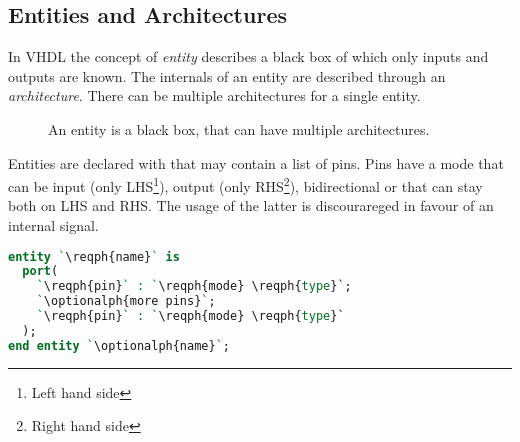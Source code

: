 \subsection{Entities and Architectures} \label{sec:vhdl:entities-arch}
In VHDL the concept of \emph{entity} describes a black box of which only
inputs and outputs are known. The internals of an entity are described through
an \emph{architecture}. There can be multiple architectures for a single entity.

\begin{figure}[h]
  \centering
  \caption{An entity is a black box, that can have multiple architectures.}
\end{figure}

Entities are declared with  that may contain a list of pins. Pins
have a mode that can be  input (only LHS\footnote{Left hand side}),
 output (only RHS\footnote{Right hand side}), 
bidirectional or  that can stay both on LHS and RHS. The usage of
the latter is discourareged in favour of an internal signal.
\begin{lstlisting}[language=vhdl]
entity `\reqph{name}` is
  port(
    `\reqph{pin}` : `\reqph{mode} \reqph{type}`;
    `\optionalph{more pins}`;
    `\reqph{pin}` : `\reqph{mode} \reqph{type}`
  );
end entity `\optionalph{name}`;
\end{lstlisting}

